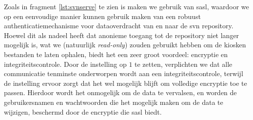 Zoals in fragment \ref{lst:svnserve} te zien is maken we gebruik van \ac{sasl}, waardoor we op een eenvoudige manier kunnen gebruik maken van een robuust authenticatiemechanisme voor dataoverdracht van en naar de \ac{svn} repository. Hoewel dit als nadeel heeft dat anonieme toegang tot de repository niet langer mogelijk is, wat we (natuurlijk \emph{read-only}) zouden gebruikt hebben om de kiosken bestanden te laten ophalen, biedt het een zeer groot voordeel: encryptie en integriteitscontrole. Door de  instelling op $1$ te zetten, verplichten we dat alle communicatie tenminste onderworpen wordt aan een integriteitscontrole, terwijl de  instelling ervoor zorgt dat het wel mogelijk blijft om volledige encryptie toe te passen. Hierdoor wordt het onmogelijk om de data te vervalsen, en worden de gebruikersnamen en wachtwoorden die het mogelijk maken om de data te wijzigen, beschermd door de encryptie die \ac{sasl} biedt.
